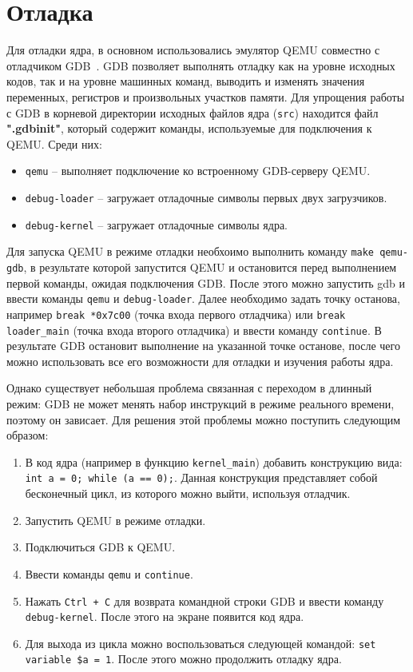 \section{Отладка}
Для отладки ядра, в основном использовались эмулятор QEMU совместно с отладчиком GDB~\cite{gdb}.
GDB позволяет выполнять отладку как на уровне исходных кодов, так и на уровне машинных команд,
выводить и изменять значения переменных, регистров и произвольных участков памяти. Для упрощения
работы с GDB в корневой директории исходных файлов ядра (\texttt{src}) находится файл \textbf{".gdbinit"},
который содержит команды, используемые для подключения к QEMU. Среди них:
\begin{itemize}
	\item \texttt{qemu} -- выполняет подключение ко встроенному GDB-серверу QEMU.
	\item \texttt{debug-loader} -- загружает отладочные символы первых двух загрузчиков.
	\item \texttt{debug-kernel} -- загружает отладочные символы ядра.
\end{itemize}

Для запуска QEMU в режиме отладки необхоимо выполнить команду \texttt{make qemu-gdb}, в результате
которой запустится QEMU и остановится перед выполнением первой команды, ожидая подключения GDB.
После этого можно запустить gdb и ввести команды \texttt{qemu} и \texttt{debug-loader}. Далее необходимо
задать точку останова, например \texttt{break *0x7c00} (точка входа первого отладчика) или \texttt{break loader\_main}
(точка входа второго отладчика) и ввести команду \texttt{continue}. В результате GDB остановит выполнение на
указанной точке останове, после чего можно использовать все его возможности для отладки и изучения работы ядра.

Однако существует небольшая проблема связанная с переходом в длинный режим: GDB не может менять набор инструкций
в режиме реального времени, поэтому он зависает. Для решения этой проблемы можно поступить следующим образом:
\begin{enumerate}[1.]
	\item В код ядра (например в функцию \texttt{kernel\_main}) добавить конструкцию вида:
		\texttt{int a = 0; while (a == 0);}. Данная конструкция представляет собой
		бесконечный цикл, из которого можно выйти, используя отладчик.
	\item Запустить QEMU в режиме отладки.
	\item Подключиться GDB к QEMU.
	\item Ввести команды \texttt{qemu} и \texttt{continue}.
	\item Нажать \texttt{Ctrl + C} для возврата командной строки GDB и ввести команду \texttt{debug-kernel}.
		После этого на экране появится код ядра.
	\item Для выхода из цикла можно воспользоваться следующей командой: \texttt{set variable \$a = 1}.
		После этого можно продолжить отладку ядра.
\end{enumerate}

